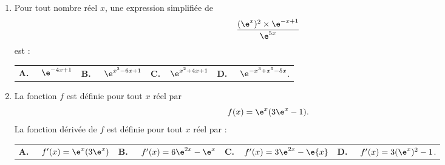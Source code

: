 \begin{enumerate}
\medskip

\item Pour tout nombre réel $x$, une expression simplifiée de \[\dfrac{(\e^x)^2\times \e^{-x+1}}{\e^{5x}}\] est :

\medskip

\begin{tabularx}{\linewidth}{*{4}{X}}
\textbf{A.~~} $\e^{-4x+1} $ &\textbf{B.~~} $\e^{x^2-6x+1} $&\textbf{C.~~}$ \e^{x^2+4x+1}$& \textbf{D.~~} $\e^{-x^3+x^5-5x}  $.
\end{tabularx}

\medskip

\item La fonction $f$ est définie pour tout $x$ réel par \[f(x)=\e^x(3\e^x-1).\]
La fonction dérivée de $f$ est définie pour tout $x$ réel par :

\medskip

\begin{tabularx}{\linewidth}{*{4}{X}}
\textbf{A.~~} $f'(x)=\e^x(3\e^x) $ &\textbf{B.~~} $f'(x)=6\e^{2x}-\e^x $&\textbf{C.~~}$f'(x)=3\e^{2x}-\e{x}$& \textbf{D.~~} $f'(x)=3(\e^x)^2-1  $.
\end{tabularx}
\end{enumerate}

\vspace{0,5cm}
